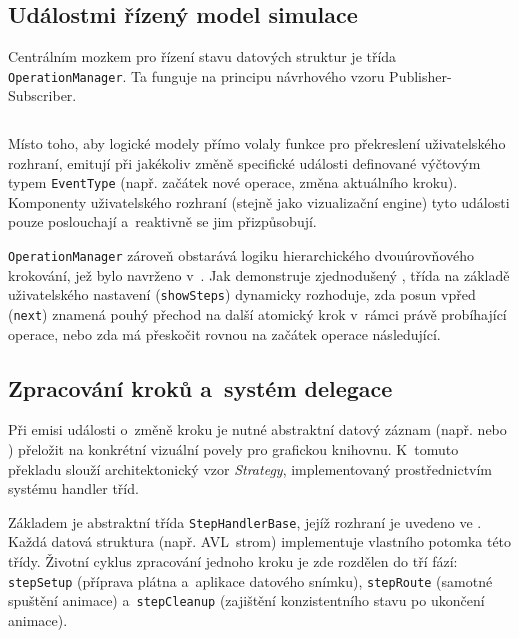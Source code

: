 \subsection{Událostmi řízený model simulace}
\label{subsec:event-driven-model}

Centrálním mozkem pro řízení stavu datových struktur je třída \texttt{OperationManager}.
Ta funguje na principu návrhového vzoru Publisher-Subscriber.

\begin{listing}[ht]
    \inputminted{typescript}{code/implementation/operationManager.ts}
    \caption{Řízení dvouúrovňového krokování a~emitování událostí ve třídě OperationManager}
    \label{code:operation_manager}
\end{listing}

Místo toho, aby logické modely přímo volaly funkce pro překreslení uživatelského rozhraní, emitují při jakékoliv změně specifické události definované výčtovým typem \texttt{EventType} (např. začátek nové operace, změna aktuálního kroku).
Komponenty uživatelského rozhraní (stejně jako vizualizační engine) tyto události pouze poslouchají a~reaktivně se jim přizpůsobují.

\texttt{OperationManager} zároveň obstarává logiku hierarchického dvouúrovňového krokování, jež bylo navrženo v~.
Jak demonstruje zjednodušený , třída na základě uživatelského nastavení (\texttt{showSteps}) dynamicky rozhoduje, zda posun vpřed (\texttt{next}) znamená pouhý přechod na další atomický krok v~rámci právě probíhající operace, nebo zda má přeskočit rovnou na začátek operace následující.

\subsection{Zpracování kroků a~systém delegace}
\label{subsec:step-handler-system}

Při emisi události o~změně kroku je nutné abstraktní datový záznam (např.  nebo ) přeložit na konkrétní vizuální povely pro grafickou knihovnu.
K~tomuto překladu slouží architektonický vzor \textit{Strategy}, implementovaný prostřednictvím systému handler tříd.

Základem je abstraktní třída \texttt{StepHandlerBase}, jejíž rozhraní je uvedeno ve .
Každá datová struktura (např. AVL~strom) implementuje vlastního potomka této třídy.
Životní cyklus zpracování jednoho kroku je zde rozdělen do tří fází: \texttt{stepSetup} (příprava plátna a~aplikace datového snímku), \texttt{stepRoute} (samotné spuštění animace) a~\texttt{stepCleanup} (zajištění konzistentního stavu po ukončení animace).

